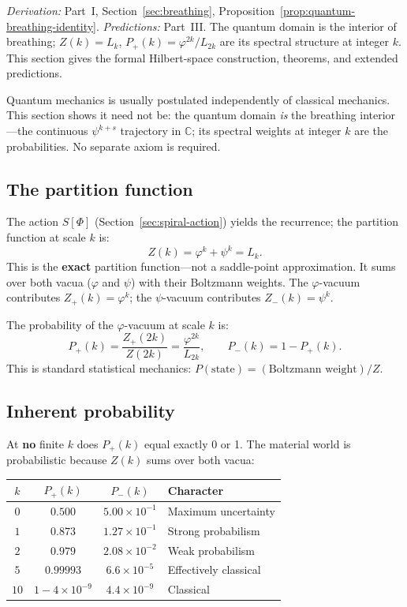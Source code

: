 \documentclass[12pt,a4paper]{article}
\begin{document}
\noindent\textit{Derivation:} Part~I, Section~\ref{sec:breathing}, Proposition~\ref{prop:quantum-breathing-identity}. \textit{Predictions:} Part~III. The quantum domain is the interior of breathing; $Z(k)=L_k$, $P_+(k)=\varphi^{2k}/L_{2k}$ are its spectral structure at integer $k$. This section gives the formal Hilbert-space construction, theorems, and extended predictions.

Quantum mechanics is usually postulated independently of classical mechanics. This section shows it need not be: the quantum domain \emph{is} the breathing interior---the continuous $\psi^{k+s}$ trajectory in $\mathbb{C}$; its spectral weights at integer $k$ are the probabilities. No separate axiom is required.

\subsection{The partition function}

The action $S[\Phi]$ (Section~\ref{sec:spiral-action}) yields the recurrence; the partition function at scale $k$ is:
\begin{equation}
Z(k) = \varphi^k + \psi^k = L_k.
\end{equation}
This is the \textbf{exact} partition function---not a saddle-point approximation. It sums over both vacua ($\varphi$ and $\psi$) with their Boltzmann weights. The $\varphi$-vacuum contributes $Z_+(k) = \varphi^k$; the $\psi$-vacuum contributes $Z_-(k) = \psi^k$.

The probability of the $\varphi$-vacuum at scale $k$ is:
\begin{equation}
\boxed{P_+(k) = \frac{Z_+(2k)}{Z(2k)} = \frac{\varphi^{2k}}{L_{2k}}, \qquad P_-(k) = 1 - P_+(k).}
\end{equation}
This is standard statistical mechanics: $P(\text{state}) = (\text{Boltzmann weight})/Z$.

\subsection{Inherent probability}

At \textbf{no} finite $k$ does $P_+(k)$ equal exactly 0 or 1. The material world is probabilistic because $Z(k)$ sums over both vacua:

\begin{center}
\begin{tabular}{|c|c|c|l|}
\hline
$k$ & $P_+(k)$ & $P_-(k)$ & \textbf{Character} \\
\hline
$0$ & $0.500$ & $5.00 \times 10^{-1}$ & Maximum uncertainty \\
$1$ & $0.873$ & $1.27 \times 10^{-1}$ & Strong probabilism \\
$2$ & $0.979$ & $2.08 \times 10^{-2}$ & Weak probabilism \\
$5$ & $0.99993$ & $6.6 \times 10^{-5}$ & Effectively classical \\
$10$ & $1 - 4 \times 10^{-9}$ & $4.4 \times 10^{-9}$ & Classical \\
\hline
\end{tabular}
\end{center}
\end{document}
